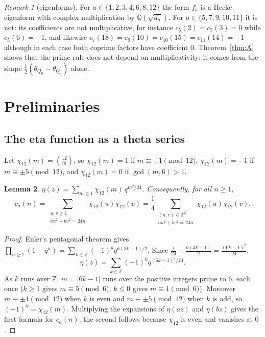 \documentclass[11pt]{amsart}
\newtheorem{lemma}{Lemma}[section]
\theoremstyle{definition}
\theoremstyle{remark}
\newtheorem{remark}[lemma]{Remark}
\newcommand{\Z}{\mathbb{Z}}
\newcommand{\Q}{\mathbb{Q}}
\newcommand{\leg}[2]{\left(\frac{#1}{#2}\right)}
\begin{document}
\begin{remark}[eigenforms]\label{rem:eigen}
For $a\in\{1,2,3,4,6,8,12\}$ the form $f_a$ is a Hecke eigenform with complex multiplication by $\Q(\sqrt{d_a})$. For $a\in\{5,7,9,10,11\}$ it is not: its coefficients are not multiplicative, for instance $c_5(2)=c_5(3)=0$ while $c_5(6)=-1$, and likewise $c_7(18)=c_9(10)=c_{10}(15)=c_{11}(14)=-1$ although in each case both coprime factors have coefficient $0$. Theorem~\ref{thm:A} shows that the prime rule does not depend on multiplicativity: it comes from the shape $\frac12(\theta_{Q_0}-\theta_{Q_4})$ alone.
\end{remark}

\section{Preliminaries}\label{sec:prelim}

\subsection{The eta function as a theta series}
Let $\chi_{12}(m)=\leg{12}{m}$, so $\chi_{12}(m)=1$ if $m\equiv\pm1\pmod{12}$, $\chi_{12}(m)=-1$ if $m\equiv\pm5\pmod{12}$, and $\chi_{12}(m)=0$ if $\gcd(m,6)>1$.

\begin{lemma}\label{lem:eta}
$\displaystyle\eta(z)=\sum_{m\ge1}\chi_{12}(m)\,q^{m^2/24}$. Consequently, for all $n\ge1$,
\[
c_a(n)=\sum_{\substack{u,v\ge1\\ au^2+bv^2=24n}}\chi_{12}(u)\chi_{12}(v)=\frac14\sum_{\substack{(u,v)\in\Z^2\\ au^2+bv^2=24n}}\chi_{12}(u)\chi_{12}(v).
\]
\end{lemma}

\begin{proof}
Euler's pentagonal theorem gives $\prod_{n\ge1}(1-q^n)=\sum_{k\in\Z}(-1)^k q^{k(3k-1)/2}$. Since $\frac1{24}+\frac{k(3k-1)}2=\frac{(6k-1)^2}{24}$,
\[
\eta(z)=\sum_{k\in\Z}(-1)^k q^{(6k-1)^2/24}.
\]
As $k$ runs over $\Z$, $m=|6k-1|$ runs over the positive integers prime to $6$, each once ($k\ge1$ gives $m\equiv5\pmod 6$, $k\le0$ gives $m\equiv1\pmod 6$). Moreover $m\equiv\pm1\pmod{12}$ when $k$ is even and $m\equiv\pm5\pmod{12}$ when $k$ is odd, so $(-1)^k=\chi_{12}(m)$. Multiplying the expansions of $\eta(az)$ and $\eta(bz)$ gives the first formula for $c_a(n)$; the second follows because $\chi_{12}$ is even and vanishes at $0$.
\end{proof}
\end{document}
